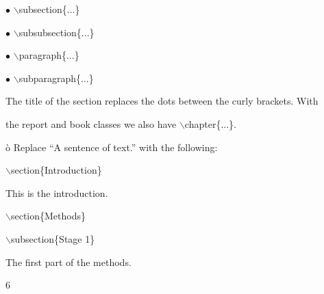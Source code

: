 \documentclass[a4paper,portrait,12pt]{article}
\begin{document}
\begin{flushleft}
$\bullet$ \ensuremath{\backslash}subsection\{...\}
\end{flushleft}


\begin{flushleft}
$\bullet$ \ensuremath{\backslash}subsubsection\{...\}
\end{flushleft}


\begin{flushleft}
$\bullet$ \ensuremath{\backslash}paragraph\{...\}
\end{flushleft}


\begin{flushleft}
$\bullet$ \ensuremath{\backslash}subparagraph\{...\}
\end{flushleft}


\begin{flushleft}
The title of the section replaces the dots between the curly brackets. With
\end{flushleft}


\begin{flushleft}
the report and book classes we also have \ensuremath{\backslash}chapter\{...\}.
\end{flushleft}


\begin{flushleft}
\`{o} Replace {``}A sentence of text.'' with the following:
\end{flushleft}


\begin{flushleft}
\ensuremath{\backslash}section\{Introduction\}
\end{flushleft}


\begin{flushleft}
This is the introduction.
\end{flushleft}


\begin{flushleft}
\ensuremath{\backslash}section\{Methods\}
\end{flushleft}


\begin{flushleft}
\ensuremath{\backslash}subsection\{Stage 1\}
\end{flushleft}


\begin{flushleft}
The first part of the methods.
\end{flushleft}





6
\end{document}
